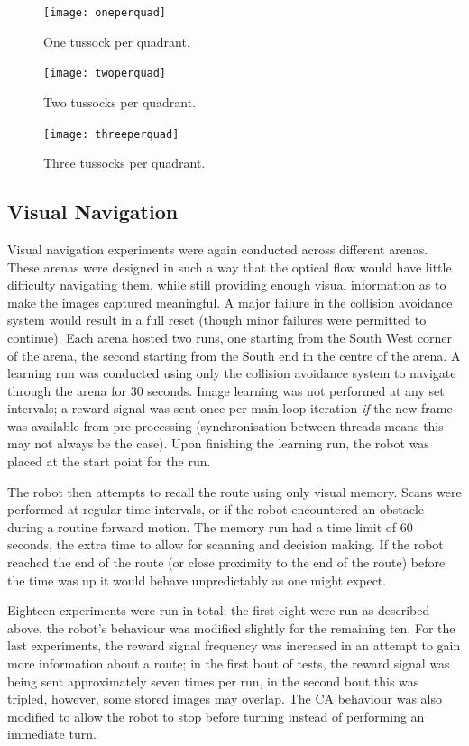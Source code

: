 \documentclass[a4paper,11pt,twoside,openright]{article}
\begin{document}
\begin{figure}[h]
  \centering
  \texttt{[image: oneperquad]}
  \caption{
    \label{fig:oneper} One tussock per quadrant.
  }
\end{figure}
\begin{figure}[h]
  \centering
  \texttt{[image: twoperquad]}
  \caption{
    \label{fig:twoper} Two tussocks per quadrant.
  }
\end{figure}
\begin{figure}[h]
  \centering
  \texttt{[image: threeperquad]}
  \caption{
    \label{fig:threeper} Three tussocks per quadrant.
  }
\end{figure}

\subsection{Visual Navigation}
Visual navigation experiments were again conducted across different arenas. These arenas were designed in such a way that the optical
flow would have little difficulty navigating them, while still providing enough visual information as to make the images captured
meaningful. A major failure in the collision avoidance system would result in a full reset (though minor failures were permitted to
continue). Each arena hosted two runs, one starting from the South West corner of the arena, the second starting from the South end
in the centre of the arena. A learning run was conducted using only the collision avoidance system to navigate through the arena
for 30 seconds. Image learning was not performed at any set intervals; a reward signal was sent once per main loop iteration \textit{if}
the new frame was available from pre-processing (synchronisation between threads means this may not always be the case). Upon finishing
the learning run, the robot was placed at the start point for the run.
\newline

The robot then attempts to recall the route using only visual memory. Scans were performed at regular time intervals, or if the robot
encountered an obstacle during a routine forward motion. The memory run had a time limit of 60 seconds, the extra time to allow for
scanning and decision making. If the robot reached the end of the route (or close proximity to the end of the route) before the time
was up it would behave unpredictably as one might expect.
\newline

Eighteen experiments were run in total; the first eight were run as described above, the robot's behaviour was modified slightly
for the remaining ten. For the last experiments, the reward signal frequency was increased in an attempt to gain more information
about a route; in the first bout of tests, the reward signal was being sent approximately seven times per run, in the second bout
this was tripled, however, some stored images may overlap. The CA behaviour was also modified to allow the robot to stop before
turning instead of performing an immediate turn.
\newline
\end{document}
